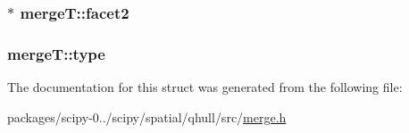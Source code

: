 \subsubsection[{facet2}]{$\ast$ merge\+T\+::facet2}\label{structmergeT_a030c58a3ac681e54bfaae0d98408ef22}
\hypertarget{structmergeT_a5ce39a7a77cdb100b8cd3efa904b1fd9}{}
\subsubsection[{type}]{ merge\+T\+::type}\label{structmergeT_a5ce39a7a77cdb100b8cd3efa904b1fd9}


The documentation for this struct was generated from the following file\+:\begin{DoxyCompactItemize}
\item 
packages/scipy-\/0../scipy/spatial/qhull/src/\hyperlink{merge_8h}{merge.\+h}\end{DoxyCompactItemize}
